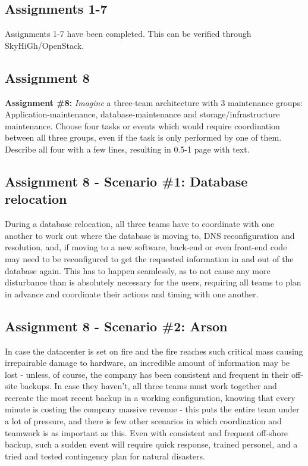 \subsection{Assignments 1-7} 
Assignments 1-7 have been completed. This can be verified through SkyHiGh/OpenStack.


\subsection{Assignment 8}
\textbf{Assignment \#8:} \textit{Imagine} a three-team architecture with 3 maintenance groups: Application-maintenance, database-maintenance and storage/infrastructure maintenance. Choose four tasks or events which would require coordination between all three groups, even if the task is only performed by one of them. Describe all four with a few lines, resulting in 0.5-1 page with text.

\subsection{Assignment 8 - Scenario \#1: Database relocation}
During a database relocation, all three teams have to coordinate with one another to work out where the database is moving to, DNS reconfiguration and resolution, and, if moving to a new software, back-end or even front-end code may need to be reconfigured to get the requested information in and out of the database again. This has to happen seamlessly, as to not cause any more disturbance than is absolutely necessary for the users, requiring all teams to plan in advance and coordinate their actions and timing with one another.

\subsection{Assignment 8 - Scenario \#2: Arson}
In case the datacenter is set on fire and the fire reaches such critical mass causing irrepairable damage to hardware, an incredible amount of information may be lost - unless, of course, the company has been consistent and frequent in their off-site backups. In case they haven't, all three teams must work together and recreate the most recent backup in a working configuration, knowing that every minute is costing the company massive revenue - this puts the entire team under a lot of pressure, and there is few other scenarios in which coordination and teamwork is as important as this. Even with consistent and frequent off-shore backup, such a sudden event will require quick response, trained personel, and a tried and tested contingency plan for natural disasters.

